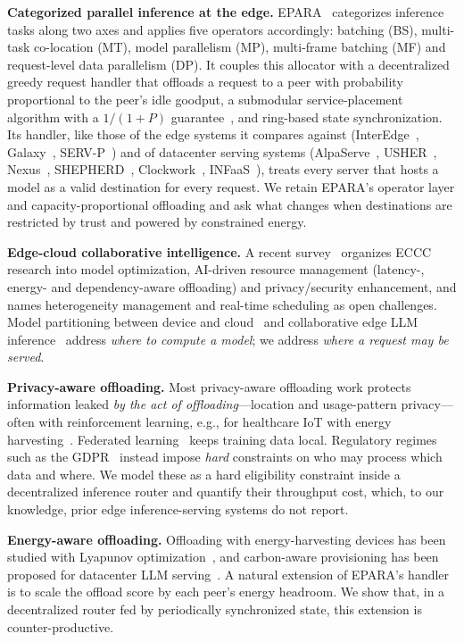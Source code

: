 \documentclass[journal]{IEEEtran}
\begin{document}
\textbf{Categorized parallel inference at the edge.}
EPARA~\cite{epara2025} categorizes inference tasks along two axes and applies five operators accordingly: batching (BS), multi-task co-location (MT), model parallelism (MP), multi-frame batching (MF) and request-level data parallelism (DP). It couples this allocator with a decentralized greedy request handler that offloads a request to a peer with probability proportional to the peer's idle goodput, a submodular service-placement algorithm with a $1/(1+P)$ guarantee~\cite{fisher1978submodular}, and ring-based state synchronization. Its handler, like those of the edge systems it compares against (InterEdge~\cite{interedge}, Galaxy~\cite{galaxy}, SERV-P~\cite{servp}) and of datacenter serving systems (AlpaServe~\cite{alpaserve}, USHER~\cite{usher}, Nexus~\cite{nexus}, SHEPHERD~\cite{shepherd}, Clockwork~\cite{clockwork}, INFaaS~\cite{infaas}), treats every server that hosts a model as a valid destination for every request. We retain EPARA's operator layer and capacity-proportional offloading and ask what changes when destinations are restricted by trust and powered by constrained energy.

\textbf{Edge-cloud collaborative intelligence.}
A recent survey~\cite{liu2025eccc} organizes ECCC research into model optimization, AI-driven resource management (latency-, energy- and dependency-aware offloading) and privacy/security enhancement, and names heterogeneity management and real-time scheduling as open challenges. Model partitioning between device and cloud~\cite{neurosurgeon} and collaborative edge LLM inference~\cite{edgeshard} address \emph{where to compute a model}; we address \emph{where a request may be served}.

\textbf{Privacy-aware offloading.}
Most privacy-aware offloading work protects information leaked \emph{by the act of offloading}---location and usage-pattern privacy---often with reinforcement learning, e.g., for healthcare IoT with energy harvesting~\cite{min2019privacy}. Federated learning~\cite{mcmahan2017fl} keeps training data local. Regulatory regimes such as the GDPR~\cite{gdpr} instead impose \emph{hard} constraints on who may process which data and where. We model these as a hard eligibility constraint inside a decentralized inference router and quantify their throughput cost, which, to our knowledge, prior edge inference-serving systems do not report.

\textbf{Energy-aware offloading.}
Offloading with energy-harvesting devices has been studied with Lyapunov optimization~\cite{mao2016harvest}, and carbon-aware provisioning has been proposed for datacenter LLM serving~\cite{ecoserve}. A natural extension of EPARA's handler is to scale the offload score by each peer's energy headroom. We show that, in a decentralized router fed by periodically synchronized state, this extension is counter-productive.
\end{document}
